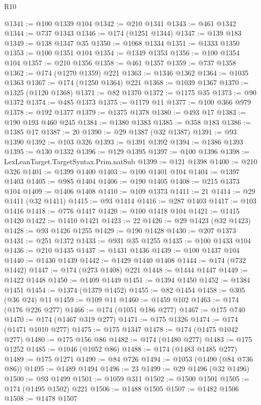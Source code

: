 \begin{lexlean}{R10}
\begin{coremodule}
@1341 := @100 @1339 @104
@1342 := @210 @1341
@1343 := @461 @1342
@1344 := @737 @1343
@1346 := @174 (@1251 @1344)
@1347 := @139 @183
@1349 := @138 @1347 @35
@1350 := @1068 @1334
@1351 := @1333 @1350
@1353 := @100 @1351 @104
@1354 := @1349 @1353
@1356 := @100 @1354 @104
@1357 := @210 @1356
@1358 := @461 @1357
@1359 := @737 @1358
@1362 := @174 (@1270 @1359) @221
@1363 := @1346 @1362
@1364 := @1035 @1363
@1367 := @174 (@1250 @1364) @221
@1368 := @1039 @1367
@1370 := @1325 (@1120 @1368)
@1371 := @82 @1370
@1372 := @1175 @35
@1373 := @90 @1372
@1374 := @485 @1373
@1375 := @1179 @11
@1377 := @100 @366 @979
@1378 := @192 @1377
@1379 := @1375 @1378
@1380 := @493 @17
@1383 := @190 @193 @460 @245
@1384 := @1380 @1383
@1385 := @358 @183
@1386 := @1385 @17
@1387 := 20
@1390 := @29 @1387 (@32 @1387)
@1391 := @93 @1390
@1392 := @103 @326
@1393 := @1391 @1392
@1394 := @1386 @1393
@1395 := @130 @1332
@1396 := @129 @1395
@1397 := @100 @1396
@1398 := LexLeanTarget.TargetSyntax.Prim.natSub
@1399 := @121 @1398
@1400 := @210 @326
@1401 := @1399 @1400
@1403 := @100 @1401 @104
@1404 := @1397 @1403
@1405 := @985 @1404
@1406 := @190 @1405
@1408 := @215 @1373 @104
@1409 := @1406 @1408
@1410 := @109 @1373
@1411 := 21
@1414 := @29 @1411 (@32 @1411)
@1415 := @93 @1414
@1416 := @287 @1403
@1417 := @103 @1416
@1418 := @776 @1417
@1420 := @100 @1418 @104
@1421 := @1415 @1420
@1422 := @1410 @1421
@1423 := 22
@1426 := @29 @1423 (@32 @1423)
@1428 := @93 @1426 @1255
@1429 := @190 @1428
@1430 := @207 @1373
@1431 := @251 @1372
@1433 := @931 @35 @1255
@1435 := @100 @1433 @104
@1436 := @210 @1435
@1437 := @1431 @1436
@1439 := @100 @1437 @104
@1440 := @1430 @1439
@1442 := @1429 @1440 @1408
@1444 := @174 (@732 @1442)
@1447 := @174 (@273 @1408) @221
@1448 := @1444 @1447
@1449 := @1422 @1448
@1450 := @1409 @1449
@1451 := @1394 @1450
@1452 := @1384 @1451
@1454 := @1374 (@1379 @1452)
@1455 := @82 @1454
@1458 := @305 (@36 @24) @11
@1459 := @109 @11
@1460 := @1459 @102
@1463 := @174 (@176 @226 @277)
@1466 := @174 (@1051 @186 @277)
@1467 := @175 @740
@1470 := @174 (@1467 @319 @277)
@1471 := @175 @1326
@1474 := @174 (@1471 @1010 @277)
@1475 := @175 @1347
@1478 := @174 (@1475 @1042 @277)
@1480 := @175 @156 @86
@1482 := @174 (@1480 @277)
@1483 := @175 @1252
@1485 := @1046 (@1052 @86)
@1488 := @174 (@1483 @1485 @277)
@1489 := @175 @1271
@1490 := @84 @726
@1494 := @1053 (@1490 (@84 @736 @86))
@1495 := @1489 @1494
@1496 := 23
@1499 := @29 @1496 (@32 @1496)
@1500 := @93 @1499
@1501 := @1059 @311
@1502 := @1500 @1501
@1505 := @174 (@1495 @1502) @221
@1506 := @1488 @1505
@1507 := @1482 @1506
@1508 := @1478 @1507

\end{coremodule}
\end{lexlean}

